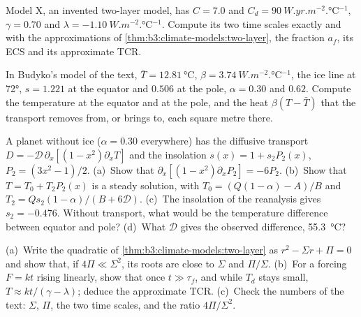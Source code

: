 \begin{exercise}[$\star\star$]\label{exo:b3:climate-models:8}
Model X, an invented two-layer model, has $C = 7.0$ and $C_d =
\qty{90}{W.yr.m^{-2}.\celsius^{-1}}$, $\gamma = 0.70$ and $\lambda =
\qty{-1.10}{W.m^{-2}.\celsius^{-1}}$. Compute its two time scales exactly
and with the approximations of \cref{thm:b3:climate-models:two-layer}, the
fraction $a_f$, its ECS and its approximate TCR.
\end{exercise}

\begin{exercise}[$\star\star$]\label{exo:b3:climate-models:9}
In Budyko's model of the text, $\bar T = \qty{12.81}{\celsius}$, $\beta =
\qty{3.74}{W.m^{-2}.\celsius^{-1}}$, the ice line at \ang{72}, $s = 1.221$
at the equator and $0.506$ at the pole, $\alpha = 0.30$ and $0.62$.
Compute the temperature at the equator and at the pole, and the heat
$\beta(T - \bar T)$ that the transport removes from, or brings to, each
square metre there.
\end{exercise}

\begin{exercise}[$\star\star\star$]\label{exo:b3:climate-models:10}
A planet without ice ($\alpha = 0.30$ everywhere) has the diffusive
transport $D = -\mathcal D\,\partial_x[(1 - x^2)\partial_xT]$ and the
insolation $s(x) = 1 + s_2P_2(x)$, $P_2 = (3x^2 - 1)/2$. (a)~Show that
$\partial_x[(1 - x^2)\partial_xP_2] = -6P_2$. (b)~Show that $T = T_0 +
T_2P_2(x)$ is a steady solution, with $T_0 = (Q(1 - \alpha) - A)/B$ and
$T_2 = Qs_2(1 - \alpha)/(B + 6\mathcal D)$. (c)~The insolation of the
reanalysis gives $s_2 = \num{-0.476}$. Without transport, what would be the
temperature difference between equator and pole? (d)~What $\mathcal D$ gives
the observed difference, \qty{55.3}{\celsius}?
\end{exercise}

\begin{exercise}[$\star\star\star$]\label{exo:b3:climate-models:11}
(a)~Write the quadratic of \cref{thm:b3:climate-models:two-layer} as $r^2 -
\Sigma r + \Pi = 0$ and show that, if $4\Pi \ll \Sigma^2$, its roots are
close to $\Sigma$ and $\Pi/\Sigma$. (b)~For a forcing $F = kt$ rising
linearly, show that once $t \gg \tau_f$, and while $T_d$ stays small,
$T \approx kt/(\gamma - \lambda)$; deduce the approximate TCR. (c)~Check
the numbers of the text: $\Sigma$, $\Pi$, the two time scales, and the
ratio $4\Pi/\Sigma^2$.
\end{exercise}

